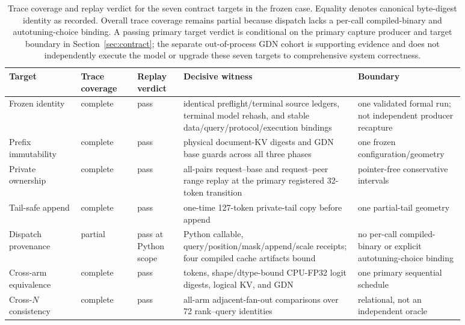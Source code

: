 \documentclass{article}
\begin{document}
\begin{table}[H]
  \caption{Trace coverage and replay verdict for the seven contract targets in
  the frozen case.  Equality denotes canonical byte-digest identity as
  recorded.  Overall trace coverage remains partial because dispatch lacks a
  per-call compiled-binary and autotuning-choice binding.  A passing primary
  target verdict is conditional on the primary capture producer and target boundary in
  Section~\ref{sec:contract}; the separate out-of-process GDN cohort is
  supporting evidence and does not independently execute the model or upgrade
  these seven targets to comprehensive system correctness.}
  \label{tab:witness}
  \centering
  \scriptsize
  \begin{tabular}{@{}>{\raggedright\arraybackslash}p{0.14\linewidth}p{0.11\linewidth}p{0.09\linewidth}>{\raggedright\arraybackslash}p{0.34\linewidth}>{\raggedright\arraybackslash}p{0.20\linewidth}@{}}
    \toprule
    Target & Trace coverage & Replay verdict & Decisive witness & Boundary \\
    \midrule
    Frozen identity & complete & pass & identical preflight/terminal source ledgers, terminal model rehash, and stable data/query/protocol/execution bindings & one validated formal run; not independent producer recapture \\
    Prefix immutability & complete & pass & physical document-KV digests and GDN base guards across all three phases & one frozen configuration/geometry \\
    Private ownership & complete & pass & all-pairs request--base and request--peer range replay at the primary registered 32-token transition & pointer-free conservative intervals \\
    Tail-safe append & complete & pass & one-time 127-token private-tail copy before append & one partial-tail geometry \\
    Dispatch provenance & partial & pass at Python scope & Python callable, query/position/mask/append/scale receipts; four compiled cache artifacts bound & no per-call compiled-binary or explicit autotuning-choice binding \\
    Cross-arm equivalence & complete & pass & tokens, shape/dtype-bound CPU-FP32 logit digests, logical KV, and GDN & one primary sequential schedule \\
    Cross-$N$ consistency & complete & pass & 288 all-arm adjacent-fan-out comparisons over 72 rank--query identities & relational, not an independent oracle \\
    \bottomrule
  \end{tabular}
\end{table}
\end{document}

